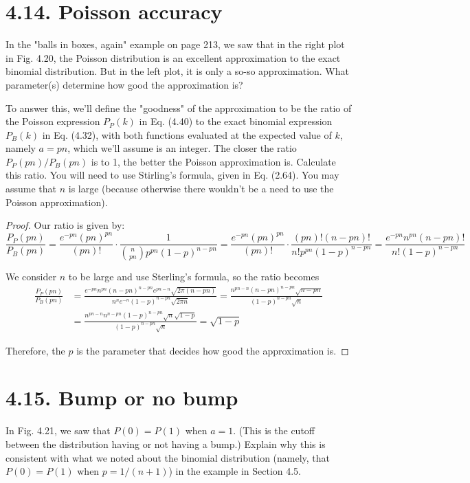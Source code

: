 \section*{4.14. Poisson accuracy}
In the "balls in boxes, again" example on page 213, we saw that in the right plot
in Fig. 4.20, the Poisson distribution is an excellent approximation to the exact
binomial distribution. But in the left plot, it is only a so-so approximation.
What parameter(s) determine how good the approximation is?

To answer this, we'll define the "goodness" of the approximation to be the ratio
of the Poisson expression $P_P(k)$ in Eq. (4.40) to the exact binomial expression
$P_B(k)$ in Eq. (4.32), with both  functions evaluated at the expected value of
$k$, namely $a = pn$, which we'll assume is an integer. The closer the ratio
$P_P(pn)/P_B(pn)$ is to 1, the better the Poisson approximation is. Calculate
this ratio. You will need to use Stirling's formula, given in Eq. (2.64). You may
assume that $n$ is large (because otherwise there wouldn't be a need to use
the Poisson approximation).

\vspace{1em}

\begin{proof}
    Our ratio is given by: 
    \[
        \frac{P_P(pn)}{P_B(pn)} = \frac{e^{-pn} (pn)^{pn}}{(pn)!} \cdot 
            \frac{1}{\binom{n}{pn}p^{pn}(1 - p)^{n - pn}}
            = \frac{e^{-pn} (pn)^{pn}}{(pn)!} \cdot \frac{(pn)!(n - pn)!}{n! p^{pn} (1-p)^{n - pn}} 
            = \frac{e^{-pn} n^{pn}(n - pn)!}{n!(1 - p)^{n - pn}}
    \] 

    We consider $n$ to be large and use Sterling's formula, so the ratio becomes
    \begin{align*}
        \frac{P_P(pn)}{P_B(pn)} 
        &= \frac{e^{-pn}n^{pn}(n - pn)^{n - pn}e^{pn - n} \sqrt{2\pi(n - pn)}}
            {n^ne^{-n}(1 - p)^{n - pn}\sqrt{2\pi n}}
        = \frac{n^{pn - n}(n - pn)^{n - pn}\sqrt{n - pn}}{(1 - p)^{n - pn}\sqrt{n}} \\
        &= \frac{n^{pn - n} n^{n - pn}(1 - p)^{n - pn}\sqrt{n}\sqrt{1 - p}}{(1 - p)^{n - pn}\sqrt{n}} 
        = \sqrt{1 - p}
    \end{align*}

    Therefore, the $p$ is the parameter that decides how good the approximation is.
\end{proof}

\section*{4.15. Bump or no bump}
In Fig. 4.21, we saw that $P(0) = P(1)$ when $a = 1$. (This is the cutoff between the distribution
having or not having a bump.) Explain why this is consistent with what we noted about
the binomial distribution (namely, that $P(0) = P(1)$ when $p = 1 / (n + 1)$) in the example 
in Section 4.5.

